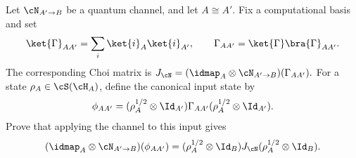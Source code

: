 Let $\cN_{A'\to B}$ be a quantum channel, and let $A\cong A'$. Fix a computational basis and set
$$
\ket{\Gamma}_{AA'}=\sum_i\ket{i}_A\ket{i}_{A'},
\qquad
\Gamma_{AA'}=\ket{\Gamma}\bra{\Gamma}_{AA'}.
$$
The corresponding Choi matrix is $J_{\cN}=(\idmap_A\otimes\cN_{A'\to B})(\Gamma_{AA'}).$
For a state $\rho_A\in\cS(\cH_A)$, define the canonical input state by
$$
\phi_{AA'}=(\rho_A^{1/2}\otimes\Id_{A'})\Gamma_{AA'}(\rho_A^{1/2}\otimes\Id_{A'}).
$$
Prove that applying the channel to this input gives
$$
(\idmap_A\otimes\cN_{A'\to B})(\phi_{AA'})
=
(\rho_A^{1/2}\otimes\Id_B)J_{\cN}(\rho_A^{1/2}\otimes\Id_B).
$$
